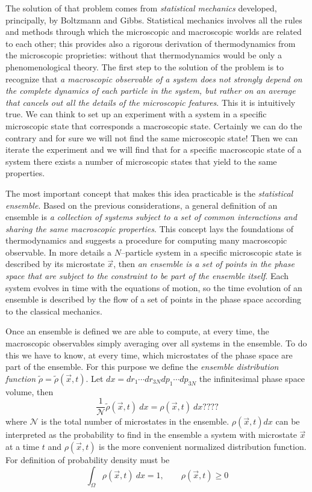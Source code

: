 The solution of that problem comes from \textit{statistical mechanics} developed, principally, by Boltzmann and Gibbs. Statistical mechanics involves all the rules and methods through which the microscopic and macroscopic worlds are related to each other; this provides also a rigorous derivation of thermodynamics from the microscopic proprieties: without that thermodynamics would be only a phenomenological theory. The first step to the solution of the problem is to recognize that \textit{a macroscopic observable of a system does not strongly depend on the complete dynamics of each particle in the system, but rather on an average that cancels out all the details of the microscopic features}. This it is intuitively true. We can think to set up an experiment with a system in a specific microscopic state that corresponds a macroscopic state. Certainly we can do the contrary and for sure we will not find the same microscopic state! Then we can iterate the experiment and we will find that for a specific macroscopic state of a system there exists a number of microscopic states that yield to the same properties.

The most important concept that makes this idea practicable is the \textit{statistical ensemble}. Based on the previous considerations, a general definition of an ensemble is \textit{a collection of systems subject to a set of common interactions and sharing the same macroscopic properties}. This concept lays the foundations of thermodynamics and suggests a procedure for computing many macroscopic observable. In more details a $N$--particle system in a specific microscopic state is described by its microstate $\vec x$, then \textit{an ensemble is a set of points in the phase space that are subject to the constraint to be part of the ensemble itself}. Each system evolves in time with the equations of motion, so the time evolution of an ensemble is described by the flow of a set of points in the phase space according to the classical mechanics.

Once an ensemble is defined we are able to compute, at every time, the macroscopic observables simply averaging 
over all systems in the ensemble. To do this we have to know, at every time, which microstates of the phase space 
are part of the ensemble. For this purpose we define the \textit{ensemble distribution function} 
$\tilde\rho = \tilde\rho(\vec x,t)$. Let $dx = dr_1\cdots dr_{3N} dp_1 \cdots dp_{3N}$ the infinitesimal phase 
space volume, then
\begin{equation*}
	\frac{1}{\mathcal{N}}\tilde\rho(\vec x, t)\ dx = \rho(\vec x, t)\ dx ????
\end{equation*}
where $\mathcal{N}$ is the total number of microstates in the ensemble. $\rho(\vec x, t)dx$ can be interpreted as 
the probability to find in the ensemble a system with microstate $\vec x$ at a time $t$ and $\rho(\vec x, t)$ is 
the more convenient normalized distribution function. For definition of probability density must be
\begin{equation*}
	\int_{\Omega} \rho(\vec x, t)\ dx = 1, \qquad \rho(\vec x, t) \ge 0
\end{equation*}

